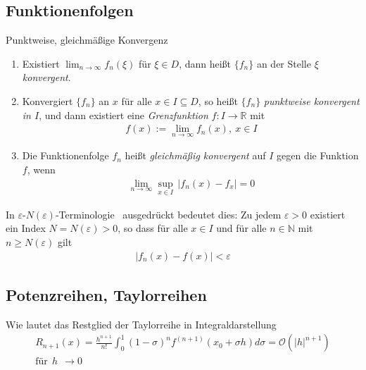 \subsection{Funktionenfolgen}
\begin{karte}{Punktweise, gleichmäßige Konvergenz}
	{\normalsize
		\begin{enumerate}[label=\(\triangleright \)]
			\item Existiert \(\displaystyle\lim_{n\to\infty}f_{n}(\xi)\) für \(\xi\in D \), dann heißt \( \{ f_n \} \) an der Stelle \( \xi \) \emph{konvergent}.
			\item Konvergiert \( \{ f_n \} \) an \(x\) für alle \(x\in I \subseteq D\), so heißt \( \{ f_n \} \) \emph{punktweise konvergent in \(I\)}, und dann existiert eine \emph{Grenzfunktion} \(f:I\to\mathbb{R}\) mit
			      \begin{align}
			      	f(x):=\lim_{n\to\infty}f_{n}(x),\ x\in I 
			      \end{align}
			\item Die Funktionenfolge \(f_{n}\) heißt \emph{gleichmäßig konvergent} auf \( I \) gegen die Funktion \( f \), wenn
			      \begin{align}
			      	\lim_{n\to\infty} \sup_{x\in I}\, \lvert f_{n}(x)-f_{x}\rvert = 0 
			      \end{align}
		\end{enumerate}
		In \glqq\(\varepsilon\)-\(N(\varepsilon)\)-Terminologie \grqq\ ausgedrückt bedeutet dies:
		Zu jedem \(\varepsilon > 0\) existiert ein Index \(N=N(\varepsilon)>0\), so dass für alle \(x\in I\) und für alle \(n\in\mathbb{N}\) mit \(n\geq N(\varepsilon)\) gilt
		\begin{align}
			\lvert f_{n}(x)-f(x)\rvert < \varepsilon 
		\end{align}
	}
\end{karte}

\subsection{Potenzreihen, Taylorreihen}
\begin{karte}{Wie lautet das Restglied der Taylorreihe in Integraldarstellung}
	\begin{multline}
		R_{n+1}(x)=\frac{h^{n+1}}{n!}\int_{0}^1{(1-\sigma)}^{n}f^{(n+1)}(x_{0}+\sigma h)d\sigma=\mathcal{O}({\lvert h\rvert}^{n+1})\\ \text{für}\ \ h\ \ \to 0
	\end{multline}
\end{karte}

